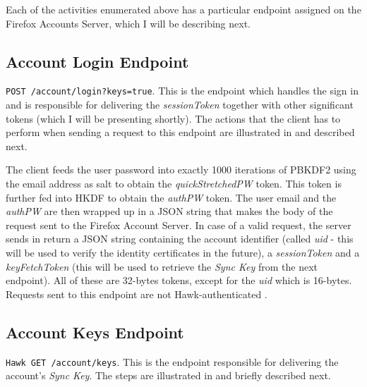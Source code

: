 Each of the activities enumerated above has a particular endpoint assigned on the Firefox Accounts Server, which I will be describing next.

\subsection{Account Login Endpoint}
\label{sub-sec:account-login-endpoint}

{\tt POST /account/login?keys=true}. This is the endpoint which handles the sign in and is responsible for delivering the \textit{sessionToken} together with other significant tokens (which I will be presenting shortly). The actions that the client has to perform when sending a request to this endpoint are illustrated in  and described next.


The client feeds the user password into exactly 1000 iterations of PBKDF2 using the email address as salt to obtain the \textit{quickStretchedPW} token. This token is further fed into HKDF to obtain the \textit{authPW} token. The user email and the \textit{authPW} are then wrapped up in a JSON string that makes the body of the request sent to the Firefox Account Server. In case of a valid request, the server sends in return a JSON string containing the account identifier (called \textit{uid} - this will be used to verify the identity certificates in the future), a \textit{sessionToken} and a \textit{keyFetchToken} (this will be used to retrieve the \textit{Sync Key} from the next endpoint). All of these are 32-bytes tokens, except for the \textit{uid} which is 16-bytes. Requests sent to this endpoint are not Hawk-authenticated \cite{onepw-protocol}.

\subsection{Account Keys Endpoint}
\label{sub-sec:account-keys-endpoint}

{\tt Hawk GET /account/keys}. This is the endpoint responsible for delivering the account's \textit{Sync Key}. The steps are illustrated in  and briefly described next.


